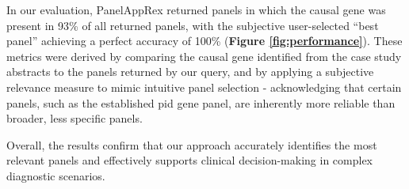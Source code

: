 In our evaluation, PanelAppRex returned panels in which the causal gene was present in 93\% of all returned panels, with the subjective user-selected ``best panel'' achieving a perfect accuracy of 100\% 
(\textbf{Figure \ref{fig:performance}}).
 These metrics were derived by comparing the causal gene identified from the case study abstracts to the panels returned by our query, and by applying a subjective relevance measure to mimic intuitive panel selection - acknowledging that certain panels, such as the established \ac{pid} gene panel, are inherently more reliable than broader, less specific panels.
 
Overall, the results confirm that our approach accurately identifies the most relevant panels and effectively supports clinical decision-making in complex diagnostic scenarios.

